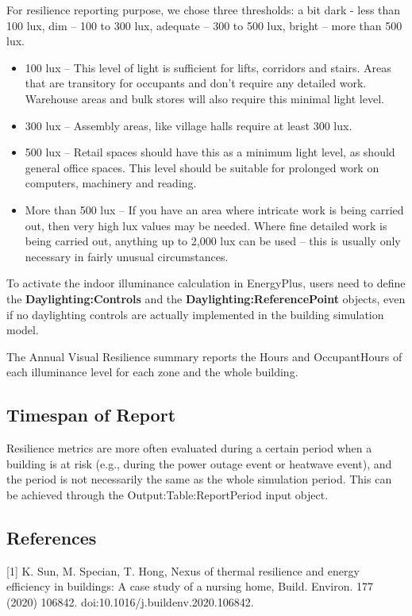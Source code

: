 For resilience reporting purpose, we chose three thresholds: a bit dark - less
than 100 lux, dim – 100 to 300 lux, adequate – 300 to 500 lux, bright – more
than 500 lux.

\begin{itemize}
\item 100 lux – This level of light is sufficient for lifts, corridors and
stairs. Areas that are transitory for occupants and don't require any detailed
work. Warehouse areas and bulk stores will also require this minimal light
level.
\item 300 lux – Assembly areas, like village halls require at least 300 lux.
\item 500 lux – Retail spaces should have this as a minimum light level, as
should general office spaces. This level should be suitable for prolonged work
on computers, machinery and reading.
\item More than 500 lux – If you have an area where intricate work is being
carried out, then very high lux values may be needed. Where fine detailed work
is being carried out, anything up to 2,000 lux can be used – this is usually
only necessary in fairly unusual circumstances.
\end{itemize}

To activate the indoor illuminance calculation in EnergyPlus, users need to
define the \textbf{Daylighting:Controls} and the
\textbf{Daylighting:ReferencePoint} objects, even if no daylighting controls are
actually implemented in the building simulation model.

The Annual Visual Resilience summary reports the Hours and OccupantHours of each
illuminance level for each zone and the whole building.

\subsection{Timespan of Report}

Resilience metrics are more often evaluated during a certain period when a
building is at risk (e.g., during the power outage event or heatwave event), and
the period is not necessarily the same as the whole simulation period. This can
be achieved through the Output:Table:ReportPeriod input object.

\subsection{References}

{[}1{]} K. Sun, M. Specian, T. Hong, Nexus of thermal resilience and energy
efficiency in buildings: A case study of a nursing home, Build. Environ. 177
(2020) 106842. doi:10.1016/j.buildenv.2020.106842.

